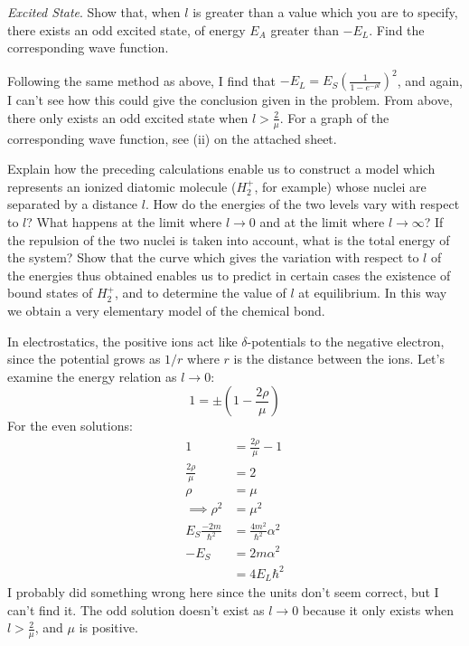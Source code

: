 \documentclass[a4paper,twoside]{article}
\begin{document}
\begin{itemize}
\begin{problem}
    \end{problem}
    \subitem[(ii)] \textit{Excited State}. Show that, when $ l $ is greater than a value which you are to specify, there exists an odd excited state, of energy $ E_A $ greater than $ -E_L $. Find the corresponding wave function.
    \begin{problem}
        Following the same method as above, I find that $ - E_L = E_S \left( \frac{1}{1 - e^{- \rho l}} \right)^2 $, and again, I can't see how this could give the conclusion given in the problem. From above, there only exists an odd excited state when $ l > \frac{2}{\mu}  $. For a graph of the corresponding wave function, see (ii) on the attached sheet.
    \end{problem}
    \subitem[(iii)] Explain how the preceding calculations enable us to construct a model which represents an ionized diatomic molecule ($ H^+_2 $, for example) whose nuclei are separated by a distance $ l $. How do the energies of the two levels vary with respect to $ l $? What happens at the limit where $ l \to 0 $ and at the limit where $ l \to \infty $? If the repulsion of the two nuclei is taken into account, what is the total energy of the system? Show that the curve which gives the variation with respect to $ l $ of the energies thus obtained enables us to predict in certain cases the existence of bound states of $ H_2^+ $, and to determine the value of $ l $ at equilibrium. In this way we obtain a very elementary model of the chemical bond.
    \begin{problem}
        In electrostatics, the positive ions act like $\delta$-potentials to the negative electron, since the potential grows as $ 1/r $ where $ r $ is the distance between the ions. Let's examine the energy relation as $ l \to 0 $:
        \begin{equation}
            1 = \pm\left(1- \frac{2 \rho}{\mu}\right)
        \end{equation}
        For the even solutions:
        \begin{align}
            1 &= \frac{2 \rho}{\mu} - 1\\
            \frac{2 \rho}{\mu} &= 2\\
            \rho &= \mu\\
            \implies \rho^2 &= \mu^2\\
            E_S \frac{-2m}{\hbar^2} &= \frac{4 m^2}{\hbar^2} \alpha^2\\
            - E_S &= 2 m \alpha^2\\
            &= 4 E_L \hbar^2
        \end{align}
        I probably did something wrong here since the units don't seem correct, but I can't find it. The odd solution doesn't exist as $ l \to 0 $ because it only exists when $ l > \frac{2}{\mu} $, and $ \mu $ is positive.


\end{problem}
\end{itemize}
\end{document}
